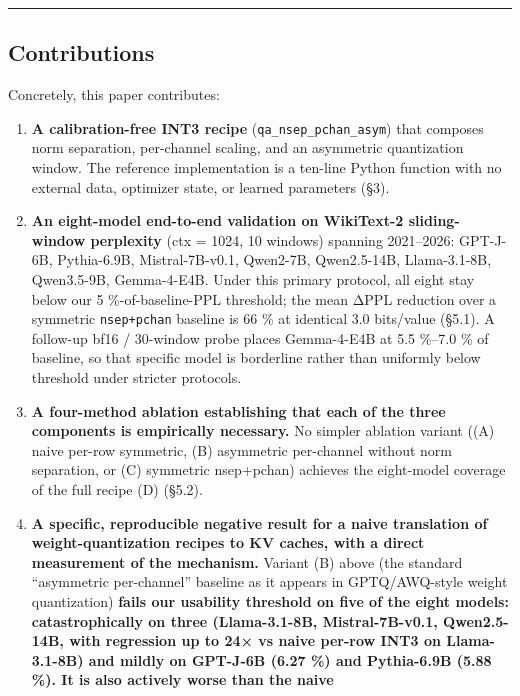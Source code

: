 \begin{center}\rule{0.5\linewidth}{0.5pt}\end{center}

\subsection{Contributions}\label{contributions}

Concretely, this paper contributes:

\begin{enumerate}
\def\labelenumi{\arabic{enumi}.}
\item
  \textbf{A calibration-free INT3 recipe}
  (\texttt{qa\_nsep\_pchan\_asym}) that composes norm separation,
  per-channel scaling, and an asymmetric quantization window. The
  reference implementation is a ten-line Python function with no
  external data, optimizer state, or learned parameters (§3).
\item
  \textbf{An eight-model end-to-end validation on WikiText-2
  sliding-window perplexity} (ctx = 1024, 10 windows) spanning
  2021--2026: GPT-J-6B, Pythia-6.9B, Mistral-7B-v0.1, Qwen2-7B,
  Qwen2.5-14B, Llama-3.1-8B, Qwen3.5-9B, Gemma-4-E4B. Under this primary
  protocol, all eight stay below our 5 \%-of-baseline-PPL threshold; the
  mean ΔPPL reduction over a symmetric \texttt{nsep+pchan} baseline is
  66 \% at identical 3.0 bits/value (§5.1). A follow-up bf16 / 30-window
  probe places Gemma-4-E4B at 5.5 \%--7.0 \% of baseline, so that
  specific model is borderline rather than uniformly below threshold
  under stricter protocols.
\item
  \textbf{A four-method ablation establishing that each of the three
  components is empirically necessary.} No simpler ablation variant ((A)
  naive per-row symmetric, (B) asymmetric per-channel without norm
  separation, or (C) symmetric nsep+pchan) achieves the eight-model
  coverage of the full recipe (D) (§5.2).
\item
  \textbf{A specific, reproducible negative result for a naive
  translation of weight-quantization recipes to KV caches, with a direct
  measurement of the mechanism.} Variant (B) above (the standard
  ``asymmetric per-channel'' baseline as it appears in GPTQ/AWQ-style
  weight quantization) \textbf{fails our usability threshold on five of
  the eight models: catastrophically on three (Llama-3.1-8B,
  Mistral-7B-v0.1, Qwen2.5-14B, with regression up to 24× vs naive
  per-row INT3 on Llama-3.1-8B) and mildly on GPT-J-6B (6.27 \%) and
  Pythia-6.9B (5.88 \%). It is also actively worse than the naive
}
\end{enumerate}
